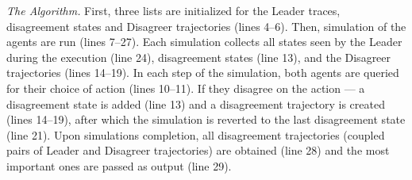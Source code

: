 \begin{table}[t]
    \centering
    \small
    \caption{Parameters  for Frogger \& Highway domains.}
    \label{tb:parameters}
\end{table}

\emph{The Algorithm.} First, three lists are initialized for the Leader traces,
disagreement states and Disagreer trajectories (lines 4--6). Then, simulation of the agents are run (lines 7--27). Each simulation collects all
states seen by the Leader during the execution (line 24), disagreement states
(line 13), and the Disagreer trajectories (lines 14--19). In each step of the
simulation, both agents are queried for their choice of action (lines
10--11). If they disagree on the action --- a disagreement state is added
(line 13) and a disagreement trajectory is created (lines 14--19), after which
the simulation is reverted to the last disagreement state (line 21). Upon simulations completion, all disagreement trajectories (coupled pairs of
Leader and Disagreer trajectories) are obtained (line 28) and the most important ones are passed as output (line 29).   



